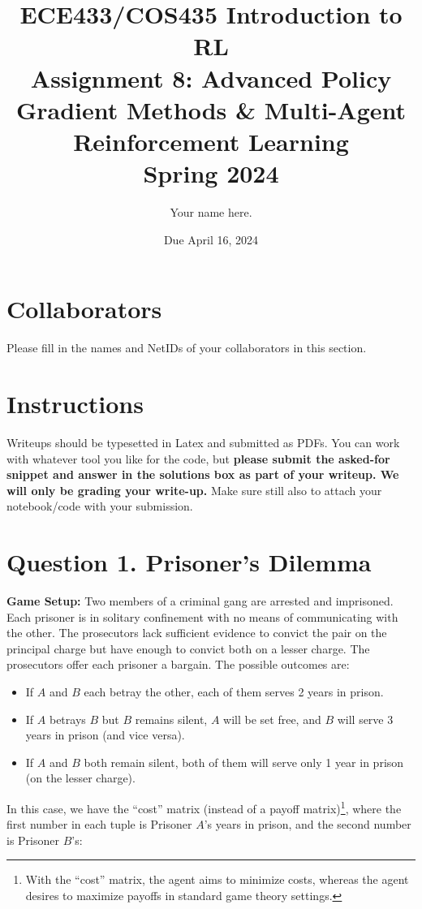 \documentclass[12pt]{article}
\date{Due April 16, 2024}
\author{\begin{fillme}[width=0.3\textwidth]
 Your name here.
\end{fillme}} %
\title{ECE433/COS435 Introduction to RL\\
  Assignment 8: Advanced Policy Gradient Methods \& Multi-Agent Reinforcement Learning\\
  Spring 2024\\
}
\begin{document}
  \maketitle
  \section*{Collaborators}
\begin{fillme}
 Please fill in the names and NetIDs of your collaborators in this section.
\end{fillme}

\section*{Instructions}

Writeups should be typesetted in Latex and submitted as PDFs. You can work with whatever tool you like for the code, but \textbf{please submit the asked-for snippet and answer in the solutions box as part of your writeup. We will only be grading your write-up.} Make sure still also to attach your notebook/code with your submission.\\


\section*{Question 1. Prisoner's Dilemma}
\textbf{Game Setup:}
Two members of a criminal gang are arrested and imprisoned. Each prisoner is in solitary confinement with no means of communicating with the other. The prosecutors lack sufficient evidence to convict the pair on the principal charge but have enough to convict both on a lesser charge. The prosecutors offer each prisoner a bargain. The possible outcomes are:

\begin{itemize}
    \item If $A$ and $B$ each betray the other, each of them serves 2 years in prison.
    \item If $A$ betrays $B$ but $B$ remains silent, $A$ will be set free, and $B$ will serve 3 years in prison (and vice versa).
    \item If $A$ and $B$ both remain silent, both of them will serve only 1 year in prison (on the lesser charge).
\end{itemize}

In this case, we have the ``cost'' matrix (instead of a payoff matrix)\footnote{With the ``cost'' matrix, the agent aims to minimize costs, whereas the agent desires to maximize payoffs in standard game theory settings.}, where the first number in each tuple is Prisoner $A$'s years in prison, and the second number is Prisoner $B$'s:
\end{document}
